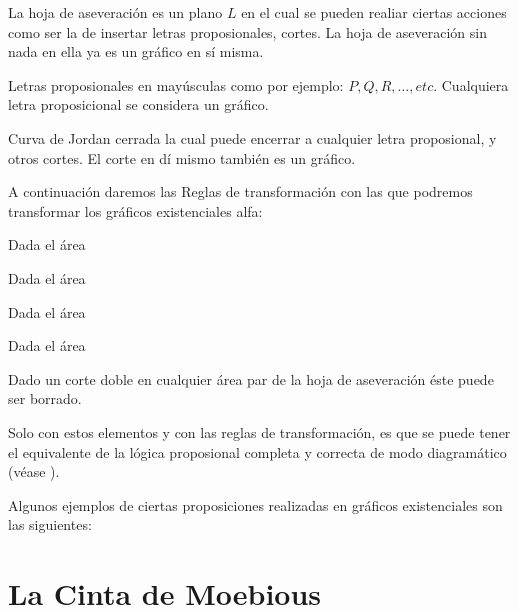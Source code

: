\documentclass[
	fontsize=10pt, %
	twoside=true, %
	secnumdepth=1, %
	abstract=true, %
]{kaohandt}
\begin{document}
\begin{definition}
	La hoja de aseveración es un plano $ L $ en el cual se pueden realiar ciertas acciones como ser la de insertar letras proposionales, cortes. La hoja de aseveración sin nada en ella ya es un gráfico en sí misma.
\end{definition}

\begin{definition}
	Letras proposionales en mayúsculas como por ejemplo: $ P, Q, R, \dots, etc $. Cualquiera letra proposicional se considera un gráfico.
\end{definition}

\begin{definition}[Corte]
	Curva de Jordan cerrada la cual puede encerrar a cualquier letra proposional, y otros cortes. El corte en dí mismo también es un gráfico.
\end{definition}

A continuación daremos las Reglas de transformación con las que podremos transformar los gráficos existenciales alfa:

\begin{definition}
	Dada el área
\end{definition}

\begin{definition}
	Dada el área
\end{definition}

\begin{definition}
	Dada el área
\end{definition}

\begin{definition}
	Dada el área
\end{definition}

\begin{definition}
	Dado un corte doble en cualquier área par de la hoja de aseveración éste puede ser borrado.
\end{definition}

Solo con estos elementos y con las reglas de transformación, es que se puede tener el equivalente de la lógica proposional completa y correcta de modo diagramático (véase \cite{roberts1973}).

Algunos ejemplos de ciertas proposiciones realizadas en gráficos existenciales son las siguientes:

\section{La Cinta de Moebious} %
\label{sec:La Cinta de Moebious}
\end{document}
